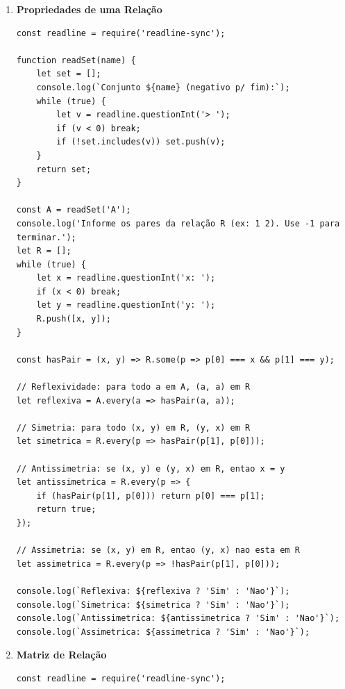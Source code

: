 \documentclass[12pt]{article}
\begin{document}
\begin{enumerate}
\begin{lstlisting}
// A x B
for (let a of A) {
    for (let b of B) {
        union.add(`(${a}, ${b})`);
    }
}

// B x A
for (let b of B) {
    for (let a of A) {
        union.add(`(${b}, ${a})`);
    }
}

console.log(`(A x B) U (B x A) = {${Array.from(union).join(', ')}}`);
\end{lstlisting}

\vspace{0.4cm}

\item \textbf{Propriedades de uma Relação}
\begin{lstlisting}
const readline = require('readline-sync');

function readSet(name) {
    let set = [];
    console.log(`Conjunto ${name} (negativo p/ fim):`);
    while (true) {
        let v = readline.questionInt('> ');
        if (v < 0) break;
        if (!set.includes(v)) set.push(v);
    }
    return set;
}

const A = readSet('A');
console.log('Informe os pares da relação R (ex: 1 2). Use -1 para terminar.');
let R = [];
while (true) {
    let x = readline.questionInt('x: ');
    if (x < 0) break;
    let y = readline.questionInt('y: ');
    R.push([x, y]);
}

const hasPair = (x, y) => R.some(p => p[0] === x && p[1] === y);

// Reflexividade: para todo a em A, (a, a) em R
let reflexiva = A.every(a => hasPair(a, a));

// Simetria: para todo (x, y) em R, (y, x) em R
let simetrica = R.every(p => hasPair(p[1], p[0]));

// Antissimetria: se (x, y) e (y, x) em R, entao x = y
let antissimetrica = R.every(p => {
    if (hasPair(p[1], p[0])) return p[0] === p[1];
    return true;
});

// Assimetria: se (x, y) em R, entao (y, x) nao esta em R
let assimetrica = R.every(p => !hasPair(p[1], p[0]));

console.log(`Reflexiva: ${reflexiva ? 'Sim' : 'Nao'}`);
console.log(`Simetrica: ${simetrica ? 'Sim' : 'Nao'}`);
console.log(`Antissimetrica: ${antissimetrica ? 'Sim' : 'Nao'}`);
console.log(`Assimetrica: ${assimetrica ? 'Sim' : 'Nao'}`);
\end{lstlisting}

\vspace{0.4cm}

\item \textbf{Matriz de Relação}
\begin{lstlisting}
const readline = require('readline-sync');


\end{lstlisting}
\end{enumerate}
\end{document}
